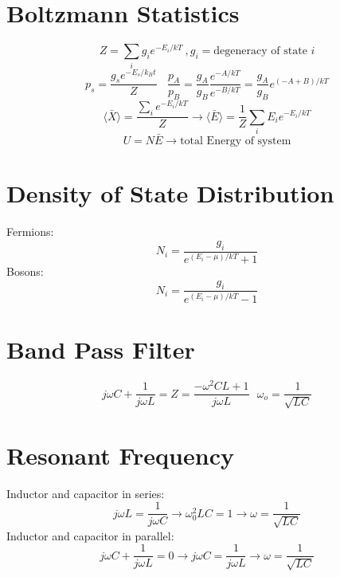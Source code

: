 \documentclass[10pt,a4paper]{article}
\begin{document}
\section{Boltzmann Statistics} %
\label{sec:boltzmann_statistics}
\begin{equation}
    Z = \sum \limits_i g_i e^{-E_i/kT}~, g_i = \textrm{degeneracy of state } i
\end{equation}
\begin{equation}
    p_s = \frac{g_s e^{-E_s/k_B t}}{Z} ~~~~ \frac{p_A}{p_B} = \frac{g_A}{g_B} \frac{e^{-A/kT}}{e^{-B/kT}} = \frac{g_A}{g_B} e^{(-A + B)/kT}
\end{equation}
\begin{equation}
    \langle \bar{X} \rangle = \frac{\sum \limits_i e^{-E_i/kT}}{Z} \rightarrow \langle\bar{E} \rangle =  \frac{1}{Z} \sum \limits_i E_i e^{-E_i/kT}
\end{equation}
\begin{equation}
    U = N \bar{E} \rightarrow \textrm{total Energy of system}
\end{equation}

\section{Density of State Distribution} %
\label{sec:density_of_state_distribution}
Fermions: 
\begin{equation}
    N_i = \frac{g_i}{e^{(E_i - \mu)/kT} + 1}
\end{equation}
Bosons:
\begin{equation}
    N_i = \frac{g_i}{ e^{(E_i - \mu)/kT } - 1}
\end{equation}

\section{Band Pass Filter} %
\label{sec:band_pass_filter}
\begin{equation}
    j\omega C + \frac{1}{j\omega L} = Z = \frac{-\omega^2 C L + 1}{j \omega L}~~~ \omega_o = \frac{1}{\sqrt{LC}}
\end{equation}

\section{Resonant Frequency} %
\label{sec:resonant_frequency}
Inductor and capacitor in series:
\begin{equation}
    j \omega L = \frac{1}{j \omega C} \rightarrow \omega_0^2 LC = 1 \rightarrow \omega = \frac{1}{\sqrt{LC}}
\end{equation}
Inductor and capacitor in parallel:
\begin{equation}
    j\omega C + \frac{1}{j \omega L} = 0 \rightarrow j \omega C = \frac{1}{j \omega L} \rightarrow \omega = \frac{1}{\sqrt{LC}}
\end{equation}
\end{document}
